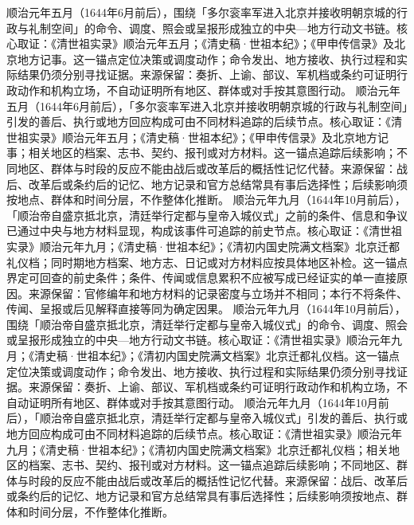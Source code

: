 顺治元年五月（1644年6月前后），围绕「多尔衮率军进入北京并接收明朝京城的行政与礼制空间」的命令、调度、照会或呈报形成独立的中央—地方行动文书链。核心取证：《清世祖实录》顺治元年五月；《清史稿·世祖本纪》；《甲申传信录》及北京地方记事。这一锚点定位决策或调度动作；命令发出、地方接收、执行过程和实际结果仍须分别寻找证据。来源保留：奏折、上谕、部议、军机档或条约可证明行政动作和机构立场，不自动证明所有地区、群体或对手按其意图行动。
顺治元年五月（1644年6月前后），「多尔衮率军进入北京并接收明朝京城的行政与礼制空间」引发的善后、执行或地方回应构成可由不同材料追踪的后续节点。核心取证：《清世祖实录》顺治元年五月；《清史稿·世祖本纪》；《甲申传信录》及北京地方记事；相关地区的档案、志书、契约、报刊或对方材料。这一锚点追踪后续影响；不同地区、群体与时段的反应不能由战后或改革后的概括性记忆代替。来源保留：战后、改革后或条约后的记忆、地方记录和官方总结常具有事后选择性；后续影响须按地点、群体和时间分层，不作整体化推断。
顺治元年九月（1644年10月前后），「顺治帝自盛京抵北京，清廷举行定都与皇帝入城仪式」之前的条件、信息和争议已通过中央与地方材料显现，构成该事件可追踪的前史节点。核心取证：《清世祖实录》顺治元年九月；《清史稿·世祖本纪》；《清初内国史院满文档案》北京迁都礼仪档；同时期地方档案、地方志、日记或对方材料应按具体地区补检。这一锚点界定可回查的前史条件；条件、传闻或信息累积不应被写成已经证实的单一直接原因。来源保留：官修编年和地方材料的记录密度与立场并不相同；本行不将条件、传闻、呈报或后见解释直接等同为确定因果。
顺治元年九月（1644年10月前后），围绕「顺治帝自盛京抵北京，清廷举行定都与皇帝入城仪式」的命令、调度、照会或呈报形成独立的中央—地方行动文书链。核心取证：《清世祖实录》顺治元年九月；《清史稿·世祖本纪》；《清初内国史院满文档案》北京迁都礼仪档。这一锚点定位决策或调度动作；命令发出、地方接收、执行过程和实际结果仍须分别寻找证据。来源保留：奏折、上谕、部议、军机档或条约可证明行政动作和机构立场，不自动证明所有地区、群体或对手按其意图行动。
顺治元年九月（1644年10月前后），「顺治帝自盛京抵北京，清廷举行定都与皇帝入城仪式」引发的善后、执行或地方回应构成可由不同材料追踪的后续节点。核心取证：《清世祖实录》顺治元年九月；《清史稿·世祖本纪》；《清初内国史院满文档案》北京迁都礼仪档；相关地区的档案、志书、契约、报刊或对方材料。这一锚点追踪后续影响；不同地区、群体与时段的反应不能由战后或改革后的概括性记忆代替。来源保留：战后、改革后或条约后的记忆、地方记录和官方总结常具有事后选择性；后续影响须按地点、群体和时间分层，不作整体化推断。
